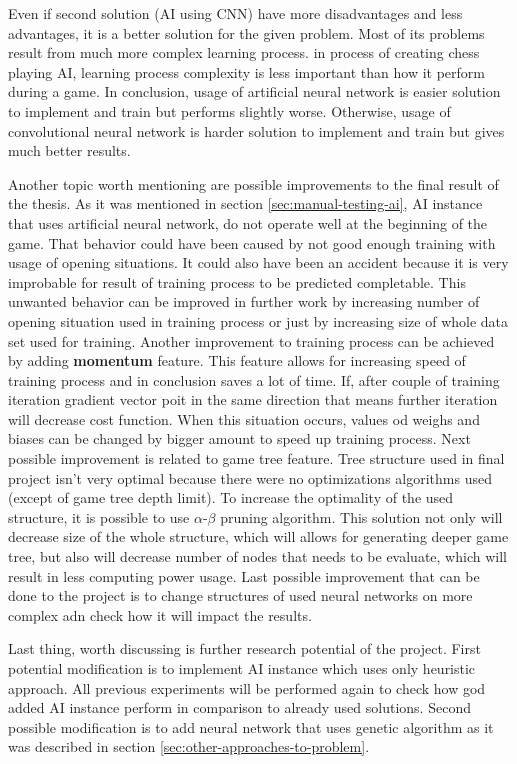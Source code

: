 Even if second solution (AI using CNN) have more disadvantages and less advantages, it is a better solution for the given problem. Most of its problems result from much more complex learning process. in process of creating chess playing AI, learning process complexity is less important than how it perform during a game. In conclusion, usage of artificial neural network is easier solution to implement and train but performs slightly worse. Otherwise, usage of convolutional neural network is harder solution to implement and train but gives much better results.

Another topic worth mentioning are possible improvements to the final result of the thesis. As it was mentioned in section \ref{sec:manual-testing-ai}, AI instance that uses artificial neural network, do not operate well at the beginning of the game. That behavior could have been caused by not good enough training with usage of opening situations. It could also have been an accident because it is very improbable for result of training process to be predicted completable. This unwanted behavior can be improved in further work by increasing number of opening situation used in training process or just by increasing size of whole data set used for training. Another improvement to training process can be achieved by adding \textbf{momentum} feature. This feature allows for increasing speed of training process and in conclusion saves a lot of time. If, after couple of training iteration gradient vector poit in the same direction that means further iteration will decrease cost function. When this situation occurs, values od weighs and biases can be changed by bigger amount to speed up training process. Next possible improvement is related to game tree feature. Tree structure used in final project isn't very optimal because there were no optimizations algorithms used (except of game tree depth limit). To increase the optimality of the used structure, it is possible to use $\alpha$-$\beta$ pruning algorithm. This solution not only will decrease size of the whole structure, which will allows for generating deeper game tree, but also will decrease number of nodes that needs to be evaluate, which will result in less computing power usage. Last possible improvement that can be done to the project is to change structures of used neural networks on more complex adn check how it will impact the results.

Last thing, worth discussing is further research potential of the project. First potential modification is to implement AI instance which uses only heuristic approach. All previous experiments will be performed again to check how god added AI instance perform in comparison to already used solutions. Second possible modification is to add neural network that uses genetic algorithm as it was described in section \ref{sec:other-approaches-to-problem}.


